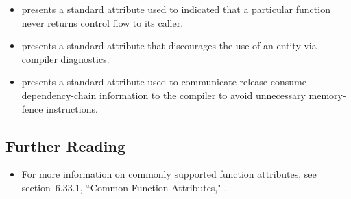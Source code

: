 \begin{itemize}
\item{presents a standard attribute used to indicated that a particular function never returns control flow to its caller.}
\item{presents a standard attribute that discourages the use of an entity via compiler diagnostics.}
\item{presents a standard attribute used to communicate release-consume dependency-chain information to the compiler to avoid unnecessary memory-fence instructions.}
\end{itemize}

\subsection[Further Reading]{Further Reading}\label{attribute-further-reading}
\begin{itemize}
\item{For more information on commonly supported function attributes, see
section~6.33.1, ``Common Function Attributes," \cite{freesoftwarefdn20}.}
\end{itemize}

